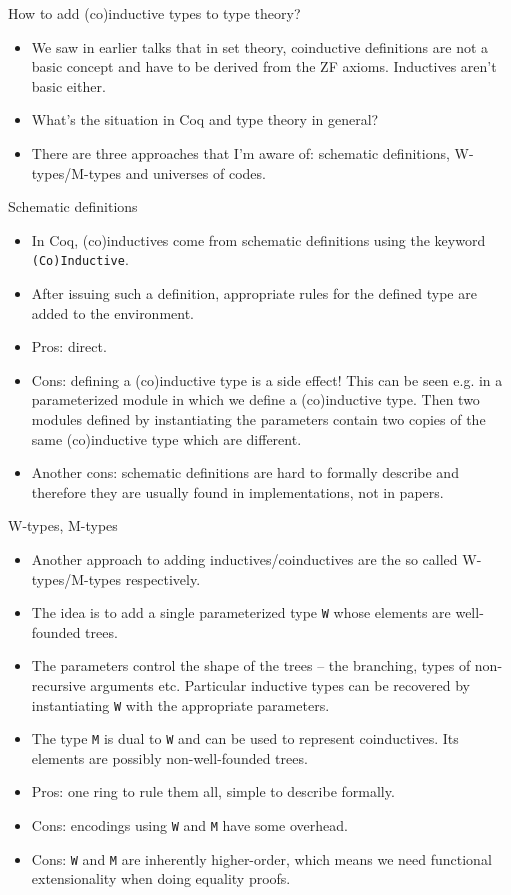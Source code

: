 \documentclass{beamer}
\begin{document}
\begin{frame}{How to add (co)inductive types to type theory?}
\begin{itemize}
	\item We saw in earlier talks that in set theory, coinductive definitions are not a basic concept and have to be derived from the ZF axioms. Inductives aren't basic either.
	\item What's the situation in Coq and type theory in general?
	\item There are three approaches that I'm aware of: schematic definitions, W-types/M-types and universes of codes.
\end{itemize}
\end{frame}

\begin{frame}{Schematic definitions}
\begin{itemize}
	\item In Coq, (co)inductives come from schematic definitions using the keyword \texttt{(Co)Inductive}.
	\item After issuing such a definition, appropriate rules for the defined type are added to the environment.
	\item Pros: direct.
	\item Cons: defining a (co)inductive type is a side effect! This can be seen e.g. in a parameterized module in which we define a (co)inductive type. Then two modules defined by instantiating the parameters contain two copies of the same (co)inductive type which are different.
	\item Another cons: schematic definitions are hard to formally describe and therefore they are usually found in implementations, not in papers.
\end{itemize}
\end{frame}

\begin{frame}{W-types, M-types}
\begin{itemize}
	\item Another approach to adding inductives/coinductives are the so called W-types/M-types respectively.
	\item The idea is to add a single parameterized type \texttt{W} whose elements are well-founded trees.
	\item The parameters control the shape of the trees -- the branching, types of non-recursive arguments etc. Particular inductive types can be recovered by instantiating \texttt{W} with the appropriate parameters.
	\item The type \texttt{M} is dual to \texttt{W} and can be used to represent coinductives. Its elements are possibly non-well-founded trees.
	\item Pros: one ring to rule them all, simple to describe formally.
	\item Cons: encodings using \texttt{W} and \texttt{M} have some overhead.
	\item Cons: \texttt{W} and \texttt{M} are inherently higher-order, which means we need functional extensionality when doing equality proofs.
\end{itemize}
\end{frame}
\end{document}
